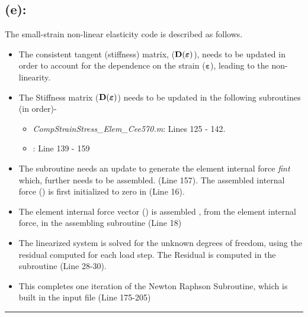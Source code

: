 \subsection*{(e): }
The small-strain non-linear elasticity code is described as follows. 
\begin{itemize}
\item The consistent tangent (stiffness) matrix, ($\bf D(\bm\varepsilon)$), needs to be updated in order to account for the dependence on the strain ($\bm\varepsilon$), leading to the non-linearity. 
\item The Stiffness matrix ($\bf D(\bm\varepsilon)$) needs to be updated in the following subroutines (in order)-
\begin{itemize}
\item \emph{CompStrainStress\_Elem\_Cee570.m}: Lines 125 - 142. 
\item {\Elast} : Line 139 - 159 
\end{itemize} 
\item The subroutine {\Elast} needs an update to generate the element internal force {\em{fint}} which, further needs to be assembled. (Line 157). The assembled internal force ({\Fb}) is first initialized to zero in {\Form} (Line 16).
\item The element internal force vector ({\Fb}) is assembled , from the element internal force, in the assembling subroutine {\Assem} (Line 18)
\item The linearized system is solved for the unknown degrees of freedom, using the residual computed for each load step. The Residual is computed in the subroutine {\Sol} (Line 28-30).
\item This completes one iteration of the Newton Raphson Subroutine, which is built in the input file {\inpt} (Line 175-205)
\end{itemize} \hrule
